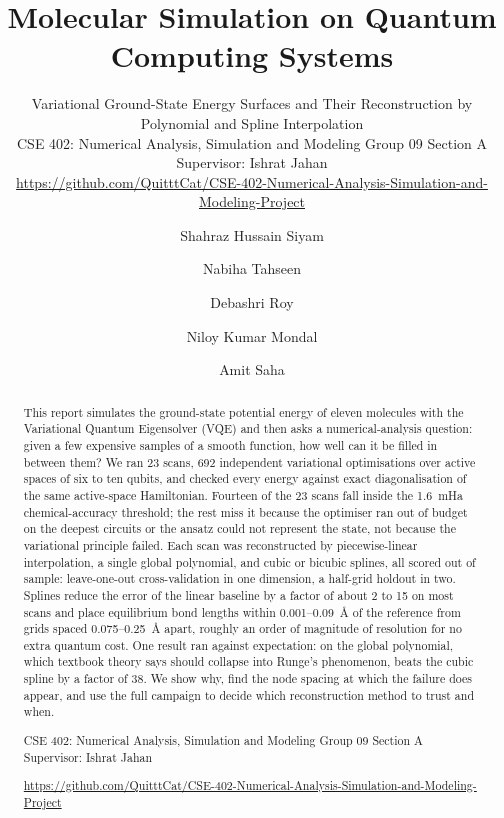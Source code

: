 \documentclass[sigconf,screen,nonacm]{acmart}
\newcommand{\BannerCourse}{CSE 402: Numerical Analysis, Simulation and Modeling \textbullet{} Group 09 \textbullet{} Section A \textbullet{} Supervisor: Ishrat Jahan}
\newcommand{\BannerGitHub}{\href{https://github.com/QuitttCat/CSE-402-Numerical-Analysis-Simulation-and-Modeling-Project}{\faGithub\hspace{0.3em}https://github.com/QuitttCat/CSE-402-Numerical-Analysis-Simulation-and-Modeling-Project}}
\newcommand{\ProjectBanner}{{\centering\small\BannerCourse\par\smallskip\BannerGitHub\par}}
\begin{document}
\title{Molecular Simulation on Quantum Computing Systems}
\subtitle{Variational Ground-State Energy Surfaces and Their Reconstruction by Polynomial and Spline Interpolation\\[6pt]{\normalfont\normalsize\BannerCourse}\\[3pt]{\normalfont\small\BannerGitHub}}

\author{Shahraz Hussain Siyam}
\author{Nabiha Tahseen}
\author{Debashri Roy}
\author{Niloy Kumar Mondal}
\author{Amit Saha}

\begin{abstract}
This report simulates the ground-state potential energy of eleven molecules with the Variational Quantum Eigensolver (VQE) and then asks a numerical-analysis question: given a few expensive samples of a smooth function, how well can it be filled in between them? We ran 23 scans, 692 independent variational optimisations over active spaces of six to ten qubits, and checked every energy against exact diagonalisation of the same active-space Hamiltonian. Fourteen of the 23 scans fall inside the 1.6~mHa chemical-accuracy threshold; the rest miss it because the optimiser ran out of budget on the deepest circuits or the ansatz could not represent the state, not because the variational principle failed. Each scan was reconstructed by piecewise-linear interpolation, a single global polynomial, and cubic or bicubic splines, all scored out of sample: leave-one-out cross-validation in one dimension, a half-grid holdout in two. Splines reduce the error of the linear baseline by a factor of about 2 to 15 on most scans and place equilibrium bond lengths within 0.001--0.09~\AA{} of the reference from grids spaced 0.075--0.25~\AA{} apart, roughly an order of magnitude of resolution for no extra quantum cost. One result ran against expectation: on  the global polynomial, which textbook theory says should collapse into Runge's phenomenon, beats the cubic spline by a factor of 38. We show why, find the node spacing at which the failure does appear, and use the full campaign to decide which reconstruction method to trust and when.
\par\medskip
\ProjectBanner
\end{abstract}
\end{document}
